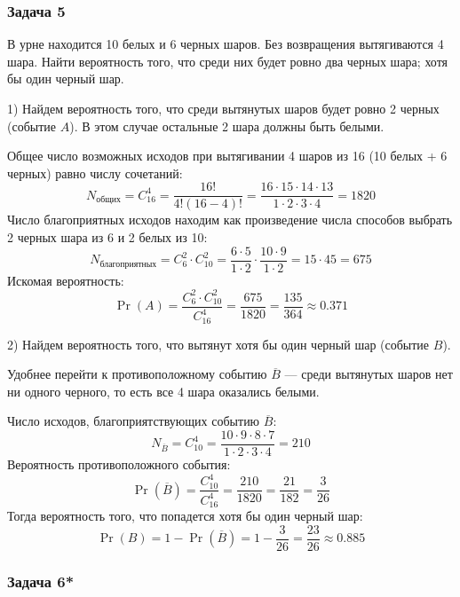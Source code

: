 \subsubsection{Задача 5}

\begin{exercise}
    В урне находится 10 белых и 6 черных шаров. Без возвращения вытягиваются 4 шара. Найти вероятность того, что среди них будет ровно два черных шара; хотя бы один черный шар.
\end{exercise}

\begin{solution}
    1) Найдем вероятность того, что среди вытянутых шаров будет ровно 2 черных (событие $A$). В этом случае остальные 2 шара должны быть белыми. 
    
    Общее число возможных исходов при вытягивании 4 шаров из 16 (10 белых + 6 черных) равно числу сочетаний:
    \[
        N_{\text{общих}} = C_{16}^4 = \frac{16!}{4!(16-4)!} = \frac{16 \cdot 15 \cdot 14 \cdot 13}{1 \cdot 2 \cdot 3 \cdot 4} = 1820
    \]
    Число благоприятных исходов находим как произведение числа способов выбрать 2 черных шара из 6 и 2 белых из 10:
    \[
        N_{\text{благоприятных}} = C_6^2 \cdot C_{10}^2 = \frac{6 \cdot 5}{1 \cdot 2} \cdot \frac{10 \cdot 9}{1 \cdot 2} = 15 \cdot 45 = 675
    \]
    Искомая вероятность:
    \[
        \Pr(A) = \frac{C_6^2 \cdot C_{10}^2}{C_{16}^4} = \frac{675}{1820} = \frac{135}{364} \approx 0.371
    \]

    2) Найдем вероятность того, что вытянут хотя бы один черный шар (событие $B$). 
    
    Удобнее перейти к противоположному событию $\overline{B}$ — среди вытянутых шаров нет ни одного черного, то есть все 4 шара оказались белыми. 
    
    Число исходов, благоприятствующих событию $\overline{B}$:
    \[
        N_{\overline{B}} = C_{10}^4 = \frac{10 \cdot 9 \cdot 8 \cdot 7}{1 \cdot 2 \cdot 3 \cdot 4} = 210
    \]
    Вероятность противоположного события:
    \[
        \Pr(\overline{B}) = \frac{C_{10}^4}{C_{16}^4} = \frac{210}{1820} = \frac{21}{182} = \frac{3}{26}
    \]
    Тогда вероятность того, что попадется хотя бы один черный шар:
    \[
        \Pr(B) = 1 - \Pr(\overline{B}) = 1 - \frac{3}{26} = \frac{23}{26} \approx 0.885
    \]
\end{solution}

\subsubsection{Задача 6*}

